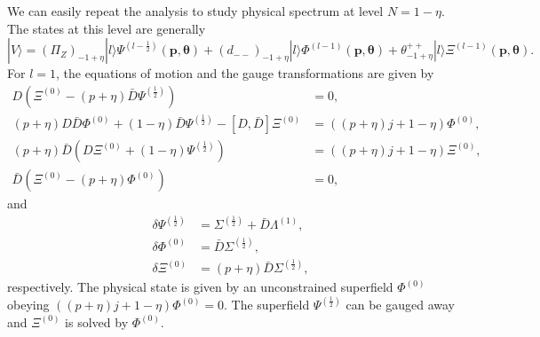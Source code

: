 \documentclass[a4paper,seceq,preprint]{ptptex}
\begin{document}
We can easily repeat the analysis to study physical spectrum 
at level $N=1-\eta$. The states at this level are generally
\begin{equation}
 |V\rangle=(\Pi_Z)_{-1+\eta}|l\rangle
\Psi^{(l-\frac{1}{2})}(\boldsymbol p,\boldsymbol\theta)
+(d_{--})_{-1+\eta}|l\rangle\Phi^{(l-1)}(\boldsymbol p,\boldsymbol\theta)
+\theta^{++}_{-1+\eta}|l\rangle\Xi^{(l-1)}(\boldsymbol p,\boldsymbol\theta).
\end{equation}
For $l=1$, the equations of motion and the gauge
transformations are given by
 \begin{align}
  D\left(\Xi^{(0)}-(p+\eta)\bar D\Psi^{(\frac{1}{2})}\right)&=0,
\nonumber\\
  (p+\eta)D\bar D\Phi^{(0)}
+(1-\eta)\bar D\Psi^{(\frac{1}{2})}
-\left[D,\bar D\right]\Xi^{(0)}&=
\left((p+\eta)j+1-\eta\right)\Phi^{(0)},\nonumber\\
  (p+\eta)\bar D\left(D\Xi^{(0)}+(1-\eta)\Psi^{(\frac{1}{2})}\right)
&=\left((p+\eta)j+1-\eta\right)\Xi^{(0)},\nonumber\\
\bar D\left(\Xi^{(0)}-(p+\eta)\Phi^{(0)}\right)&=0,
 \end{align}
and
 \begin{align}
  \delta\Psi^{(\frac{1}{2})}&=
     \Sigma^{(\frac{1}{2})}+\bar D\Lambda^{(1)},\nonumber\\
  \delta\Phi^{(0)}&=
     \bar D\Sigma^{(\frac{1}{2})},\nonumber\\
  \delta\Xi^{(0)}&=
     (p+\eta)\bar D\Sigma^{(\frac{1}{2})},
 \end{align}
respectively. The physical state is given by an unconstrained
superfield $\Phi^{(0)}$ obeying
$\left((p+\eta)j+1-\eta\right)\Phi^{(0)}=0$.
The superfield $\Psi^{(\frac{1}{2})}$ can be gauged away and 
$\Xi^{(0)}$ is solved by $\Phi^{(0)}$.
\end{document}

